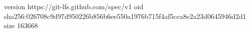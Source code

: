 version https://git-lfs.github.com/spec/v1
oid sha256:026708c9d97d950226b856b6ee550a1976b715f4af5cca8e2a23d0645946d2d1
size 163668
